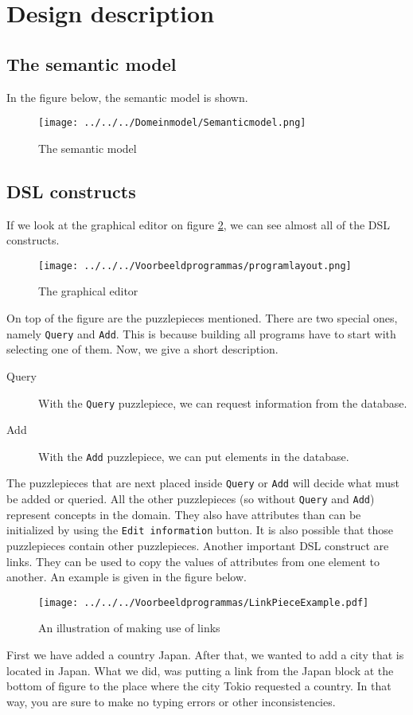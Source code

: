 \section{Design description}
\subsection{The semantic model}
In the figure below, the semantic model is shown.
\begin{figure}[H]
	\centering
	\texttt{[image: ../../../Domeinmodel/Semanticmodel.png]}
	\caption{The semantic model}
	\label{Semanticmodel}
\end{figure}
\subsection{DSL constructs}
If we look at the graphical editor on figure \ref{fig:DSLlayoutinconstructs}, we can see almost all of the DSL constructs.
\begin{figure}[H]
	\centering
	\texttt{[image: ../../../Voorbeeldprogrammas/programlayout.png]}
	\caption{The graphical editor}
	\label{fig:DSLlayoutinconstructs}
\end{figure}
\noindent On top of the figure are the puzzlepieces mentioned. There are two special ones, namely \texttt{Query} and \texttt{Add}. This is because building all programs have to start with selecting one of them.  Now, we give a short description.
\begin{description}
 \item[Query] With the \texttt{Query} puzzlepiece, we can request information from the database.
 \item[Add] With the \texttt{Add} puzzlepiece, we can put elements in the database.  
\end{description}
The puzzlepieces that are next placed inside \texttt{Query} or \texttt{Add} will decide what must be added or queried.
All the other puzzlepieces (so without \texttt{Query} and \texttt{Add}) represent concepts in the domain. They also have attributes than can be initialized by using the \texttt{Edit information} button. It is also possible that those puzzlepieces contain other puzzlepieces. 
Another important DSL construct are links. They can be used to copy the values of attributes from one element to another. An example is given in the figure below.
\begin{figure}[H]
	\centering
	\texttt{[image: ../../../Voorbeeldprogrammas/LinkPieceExample.pdf]}
	\caption{An illustration of making use of links}
	\label{linkpieceexample}
\end{figure}
First we have added a country Japan. After that, we wanted to add a city that is located in Japan. What we did, was putting a link from the Japan block at the bottom of figure to the place where the city Tokio requested a country. In that way, you are sure to make no typing errors or other inconsistencies.

